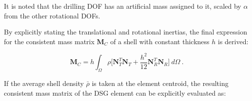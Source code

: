 It is noted that the drilling DOF has an artificial mass assigned to it, scaled by $\alpha$ from the other rotational DOFs.

By explicitly stating the translational and rotational inertias, the final expression for the consistent mass matrix $\mathbf{M}_C$ of a shell with constant thickness $h$ is derived:

\begin{equation} 
\mathbf{M}_C
=
h
\int_{\Omega} 
\rho 
\Big[
\mathbf{N}_T^T
\mathbf{N}_T
+
\frac{h^2}{12}
\mathbf{N}_R^T
\mathbf{N}_R
\Big]
\ d\Omega
\label{eqt17_10}\ .
\end{equation}

If the average shell density $\bar{\rho}$ is taken at the element centroid, the resulting consistent mass matrix of the DSG element can be explicitly evaluated as:


